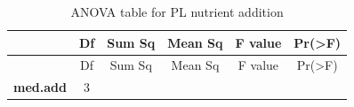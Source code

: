 \documentclass[]{article}
\begin{document}
\begin{longtable}[]{@{}cccccc@{}}
\caption{ANOVA table for PL nutrient addition}\tabularnewline
\toprule
\begin{minipage}[b]{0.19\columnwidth}\centering\strut
~
\strut\end{minipage} &
\begin{minipage}[b]{0.06\columnwidth}\centering\strut
Df
\strut\end{minipage} &
\begin{minipage}[b]{0.10\columnwidth}\centering\strut
Sum Sq
\strut\end{minipage} &
\begin{minipage}[b]{0.12\columnwidth}\centering\strut
Mean Sq
\strut\end{minipage} &
\begin{minipage}[b]{0.12\columnwidth}\centering\strut
F value
\strut\end{minipage} &
\begin{minipage}[b]{0.12\columnwidth}\centering\strut
Pr(\textgreater{}F)
\strut\end{minipage}\tabularnewline
\midrule
\endfirsthead
\toprule
\begin{minipage}[b]{0.19\columnwidth}\centering\strut
~
\strut\end{minipage} &
\begin{minipage}[b]{0.06\columnwidth}\centering\strut
Df
\strut\end{minipage} &
\begin{minipage}[b]{0.10\columnwidth}\centering\strut
Sum Sq
\strut\end{minipage} &
\begin{minipage}[b]{0.12\columnwidth}\centering\strut
Mean Sq
\strut\end{minipage} &
\begin{minipage}[b]{0.12\columnwidth}\centering\strut
F value
\strut\end{minipage} &
\begin{minipage}[b]{0.12\columnwidth}\centering\strut
Pr(\textgreater{}F)
\strut\end{minipage}\tabularnewline
\midrule
\endhead
\begin{minipage}[t]{0.19\columnwidth}\centering\strut
\textbf{med.add}
\strut\end{minipage} &
\begin{minipage}[t]{0.06\columnwidth}\centering\strut
3
\strut\end{minipage} &
\begin{minipage}[t]{0.10\columnwidth}\centering\strut

\end{minipage}
\end{longtable}
\end{document}
